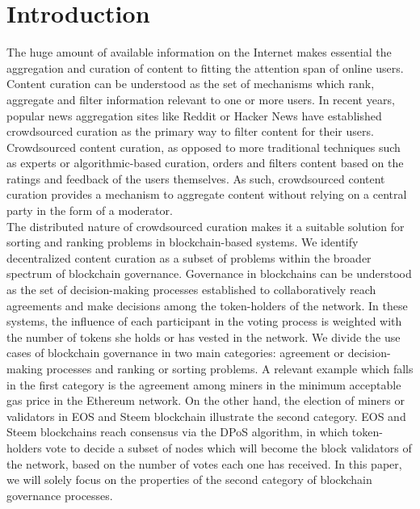 \section{Introduction}
    
  The huge amount of available information on the Internet makes essential the aggregation and curation of content to fitting the attention span of online users. Content curation can be understood as the set of mechanisms which rank, aggregate and filter information relevant to one or more users. In recent years, popular news aggregation sites like Reddit or Hacker News have established crowdsourced curation as the primary way to filter content for their users. Crowdsourced content curation, as opposed to more traditional techniques such as experts or algorithmic-based curation, orders and filters content based on the ratings and feedback of the users themselves. As such, crowdsourced content curation provides a mechanism to aggregate content without relying on a central party in the form of a moderator.\\
  
  The distributed nature of crowdsourced curation makes it a suitable solution for sorting and ranking problems in blockchain-based systems. We identify decentralized content curation as a subset of problems within the broader spectrum of blockchain governance. Governance in blockchains can be understood as the set of decision-making processes established to collaboratively reach agreements and make decisions among the token-holders of the network. In these systems, the influence of each participant in the voting process is weighted with the number of tokens she holds or has vested in the network. We divide the use cases of blockchain governance in two main categories: agreement or decision-making processes and ranking or sorting problems. A relevant example which falls in the first category is the agreement among miners in the minimum acceptable gas price in the Ethereum network. On the other hand, the election of miners or validators in EOS and Steem blockchain illustrate the second category. EOS and Steem blockchains reach consensus via the DPoS algorithm, in which token-holders vote to decide a subset of nodes which will become the block validators of the network, based on the number of votes each one has received. In this paper, we will solely focus on the properties of the second category of blockchain governance processes.\\
  
